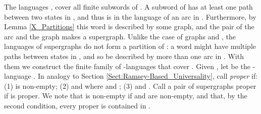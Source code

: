 \documentclass{LMCS}
\begin{document}
The languages , cover all
finite subwords of . A subword of  has at least one
path between two states in , and thus is in the language of an arc in
.  Furthermore, by Lemma \ref{X_Partitions} this word is described by some graph, and
the pair of the arc and the graph makes a supergraph. Unlike the case of graphs and
, the languages of supergraphs do not form a partition of : a
word might have multiple paths between states in , and so be described by
more than one arc in . With them we construct the finite family of
-languages that cover . Given , let  be the -language
. In analogy to Section
\ref{Sect:Ramsey-Based_Universality}, call  \emph{proper}
if: (1)  is non-empty; (2)  and
 where  and ; (3)
 and
.  Call a pair of
supergraphs  proper if  is proper.  We
note that  is non-empty if  and  are
non-empty, and that, by the second condition, every proper  is
contained in .
\end{document}
